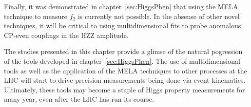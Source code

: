 Finally, it was demonstrated in chapter~\ref{sec:HiggsPhen}
that using the MELA technique to measure $f_{2}$ is currently 
not possible.  In the absense of other novel techniques, it
will be critical to using multidimensional fits to probe 
anomalous CP-even couplings in the HZZ amplitude.  

The studies presented in this chapter provide a glimse of the 
natural pogression of the tools developed in
chapter~\ref{sec:HiggsPhen}.  The use of multidimensional 
tools as well as the application of the MELA techniques to
other processes at the LHC will start to drive precision
measurements being done via event kinematics.  Ultimately, 
these tools may become a staple of Higgs property measurements
for many year, even after the LHC has run its course.  




